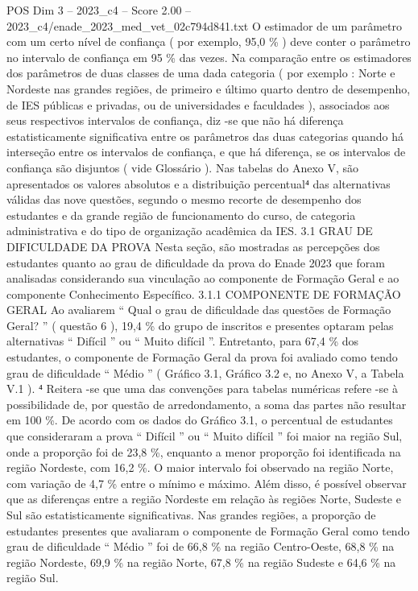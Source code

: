\begin{textsample}{POS Dim 3 – 2023\_c4 – Score 2.00 – 2023\_c4/enade\_2023\_med\_vet\_02c794d841.txt}
O estimador de um parâmetro com um certo nível de confiança ( por exemplo, 95,0 \% ) deve conter o parâmetro no intervalo de confiança em 95 \% das vezes.
Na comparação entre os estimadores dos parâmetros de duas classes de uma dada categoria ( por exemplo : Norte e Nordeste nas grandes regiões, de primeiro e último quarto dentro de desempenho, de IES públicas e privadas, ou de universidades e faculdades ), associados aos seus respectivos intervalos de confiança, diz -se que não há diferença estatisticamente significativa entre os parâmetros das duas categorias quando há interseção entre os intervalos de confiança, e que há diferença, se os intervalos de confiança são disjuntos ( vide Glossário ).
Nas tabelas do Anexo V, são apresentados os valores absolutos e a distribuição percentual⁴ das alternativas válidas das nove questões, segundo o mesmo recorte de desempenho dos estudantes e da grande região de funcionamento do curso, de categoria administrativa e do tipo de organização acadêmica da IES. 3.1 GRAU DE DIFICULDADE DA PROVA Nesta seção, são mostradas as percepções dos estudantes quanto ao grau de dificuldade da prova do Enade 2023 que foram analisadas considerando sua vinculação ao componente de Formação Geral e ao componente Conhecimento Específico. 3.1.1 COMPONENTE DE FORMAÇÃO GERAL Ao avaliarem “ Qual o grau de dificuldade das questões de Formação Geral? ” ( questão 6 ), 19,4 \% do grupo de inscritos e presentes optaram pelas alternativas “ Difícil ” ou “ Muito difícil ”.
Entretanto, para 67,4 \% dos estudantes, o componente de Formação Geral da prova foi avaliado como tendo grau de dificuldade “ Médio ” ( Gráfico 3.1, Gráfico 3.2 e, no Anexo V, a Tabela V.1 ). ⁴ Reitera -se que uma das convenções para tabelas numéricas refere -se à possibilidade de, por questão de arredondamento, a soma das partes não resultar em 100 \%.
De acordo com os dados do Gráfico 3.1, o percentual de estudantes que consideraram a prova “ Difícil ” ou “ Muito difícil ” foi maior na região Sul, onde a proporção foi de 23,8 \%, enquanto a menor proporção foi identificada na região Nordeste, com 16,2 \%.
O maior intervalo foi observado na região Norte, com variação de 4,7 \% entre o mínimo e máximo.
Além disso, é possível observar que as diferenças entre a região Nordeste em relação às regiões Norte, Sudeste e Sul são estatisticamente significativas.
Nas grandes regiões, a proporção de estudantes presentes que avaliaram o componente de Formação Geral como tendo grau de dificuldade “ Médio ” foi de 66,8 \% na região Centro-Oeste, 68,8 \% na região Nordeste, 69,9 \% na região Norte, 67,8 \% na região Sudeste e 64,6 \% na região Sul.

\end{textsample}
